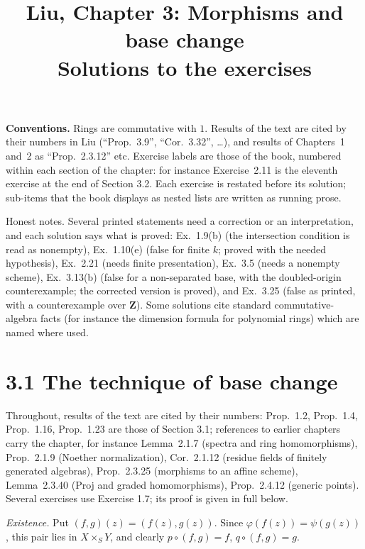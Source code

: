 \documentclass[11pt]{article}
\title{Liu, Chapter 3: Morphisms and base change\\[2pt]\large Solutions to the exercises}
\author{}
\date{}
\begin{document}
\maketitle
\noindent\textbf{Conventions.} Rings are commutative with $1$. Results of the text are cited by their numbers in Liu (``Prop.~3.9'', ``Cor.~3.32'', \dots), and results of Chapters~1 and~2 as ``Prop.~2.3.12'' etc. Exercise labels are those of the book, numbered within each section of the chapter: for instance Exercise~2.11 is the eleventh exercise at the end of Section 3.2. Each exercise is restated before its solution; sub-items that the book displays as nested lists are written as running prose.

Honest notes. Several printed statements need a correction or an interpretation, and each solution says what is proved: Ex.~1.9(b) (the intersection condition is read as nonempty), Ex.~1.10(e) (false for finite $k$; proved with the needed hypothesis), Ex.~2.21 (needs finite presentation), Ex.~3.5 (needs a nonempty scheme), Ex.~3.13(b) (false for a non-separated base, with the doubled-origin counterexample; the corrected version is proved), and Ex.~3.25 (false as printed, with a counterexample over $\mathbf Z$). Some solutions cite standard commutative-algebra facts (for instance the dimension formula for polynomial rings) which are named where used.

\section*{3.1 The technique of base change}

Throughout, results of the text are cited by their numbers: Prop.~1.2, Prop.~1.4, Prop.~1.16, Prop.~1.23 are those of Section 3.1; references to earlier chapters carry the chapter, for instance Lemma~2.1.7 (spectra and ring homomorphisms), Prop.~2.1.9 (Noether normalization), Cor.~2.1.12 (residue fields of finitely generated algebras), Prop.~2.3.25 (morphisms to an affine scheme), Lemma~2.3.40 (Proj and graded homomorphisms), Prop.~2.4.12 (generic points). Several exercises use Exercise 1.7; its proof is given in full below.

\pf
\emph{Existence.} Put $(f,g)(z)=(f(z),g(z))$. Since $\varphi(f(z))=\psi(g(z))$, this pair lies in $X\times_S Y$, and clearly $p\circ(f,g)=f$, $q\circ(f,g)=g$.
\end{document}
